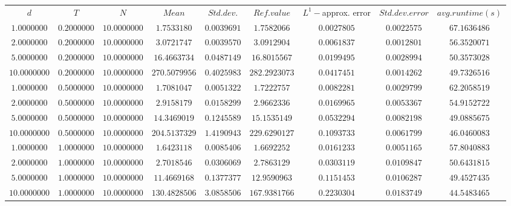 \begin{tabular}{ccccccccc}
$d$ & $T$ & $N$ & $Mean$ & $Std. dev.$ & $Ref. value$ & $L^1-$approx. error & $Std. dev. error$ & $avg. runtime (s)$\\
$1.0000000$ & $0.2000000$ & $10.0000000$ & $1.7533180$ & $0.0039691$ & $1.7582066$ & $0.0027805$ & $0.0022575$ & $67.1636486$\\
$2.0000000$ & $0.2000000$ & $10.0000000$ & $3.0721747$ & $0.0039570$ & $3.0912904$ & $0.0061837$ & $0.0012801$ & $56.3520071$\\
$5.0000000$ & $0.2000000$ & $10.0000000$ & $16.4663734$ & $0.0487149$ & $16.8015567$ & $0.0199495$ & $0.0028994$ & $50.3573028$\\
$10.0000000$ & $0.2000000$ & $10.0000000$ & $270.5079956$ & $0.4025983$ & $282.2923073$ & $0.0417451$ & $0.0014262$ & $49.7326516$\\
$1.0000000$ & $0.5000000$ & $10.0000000$ & $1.7081047$ & $0.0051322$ & $1.7222757$ & $0.0082281$ & $0.0029799$ & $62.2058519$\\
$2.0000000$ & $0.5000000$ & $10.0000000$ & $2.9158179$ & $0.0158299$ & $2.9662336$ & $0.0169965$ & $0.0053367$ & $54.9152722$\\
$5.0000000$ & $0.5000000$ & $10.0000000$ & $14.3469019$ & $0.1245589$ & $15.1535149$ & $0.0532294$ & $0.0082198$ & $49.0885675$\\
$10.0000000$ & $0.5000000$ & $10.0000000$ & $204.5137329$ & $1.4190943$ & $229.6290127$ & $0.1093733$ & $0.0061799$ & $46.0460083$\\
$1.0000000$ & $1.0000000$ & $10.0000000$ & $1.6423118$ & $0.0085406$ & $1.6692252$ & $0.0161233$ & $0.0051165$ & $57.8040883$\\
$2.0000000$ & $1.0000000$ & $10.0000000$ & $2.7018546$ & $0.0306069$ & $2.7863129$ & $0.0303119$ & $0.0109847$ & $50.6431815$\\
$5.0000000$ & $1.0000000$ & $10.0000000$ & $11.4669168$ & $0.1377377$ & $12.9590963$ & $0.1151453$ & $0.0106287$ & $49.4527435$\\
$10.0000000$ & $1.0000000$ & $10.0000000$ & $130.4828506$ & $3.0858506$ & $167.9381766$ & $0.2230304$ & $0.0183749$ & $44.5483465$\\
\end{tabular}
